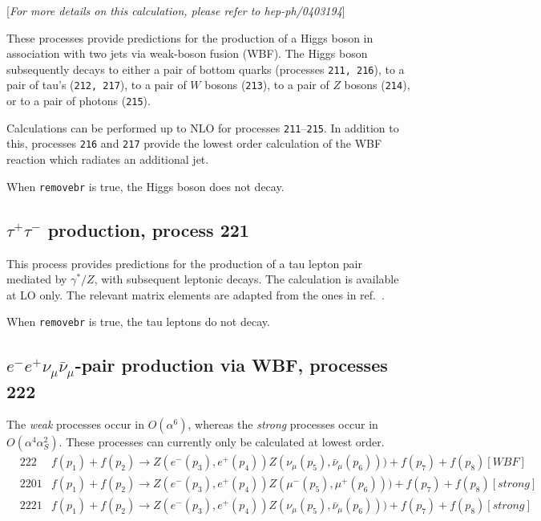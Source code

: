 \documentclass{article}
\begin{document}
{{{{{{\begin{center}
[{\it For more details on this calculation, please refer to hep-ph/0403194}]
\end{center}

These processes provide predictions for the production of a Higgs boson in
association with two jets via weak-boson fusion (WBF). The Higgs boson
subsequently decays to either a pair of bottom quarks
(processes {\tt 211, 216}), to a pair of tau's ({\tt 212, 217}), 
to a pair of $W$ bosons ({\tt 213}),
to a pair of $Z$ bosons ({\tt 214}),
or to a pair of photons ({\tt 215}).

Calculations can be performed up to NLO for processes {\tt 211}--{\tt 215}.
In addition to this, processes {\tt 216} and {\tt 217} provide the lowest
order calculation of the WBF reaction which radiates an additional jet. 

When {\tt removebr} is true, the Higgs boson does not decay.

\subsection{$\tau^+\tau^-$ production, process 221}
\label{subsec:tautau}

This process provides predictions for the production of a tau lepton
pair mediated by $\gamma^*/Z$, with subsequent leptonic decays. The calculation is available at LO
only. The relevant matrix elements are adapted from the ones in
ref.~\cite{Kleiss:1988xr}.

When {\tt removebr} is true, the tau leptons do not decay.


%
\subsection{$e^-e^+ \nu_{\mu} \bar\nu_{\mu} $-pair production via WBF, processes 222}
The {\it weak} processes occur in $O(\alpha^6)$, whereas the {\it strong} processes occur in $O(\alpha^4 \alpha_S^2)$.
These processes can currently only be calculated at lowest order.
\begin{eqnarray}
&222 &  f(p_1)+f(p_2) \to Z(e^-(p_3),e^+(p_4))Z(\nu_\mu(p_5),\bar{\nu}_\mu(p_6)))+f(p_7)+f(p_8) [WBF]  \nonumber \\
&2201 & f(p_1)+f(p_2) \to Z(e^-(p_3),e^+(p_4))Z(\mu^-(p_5),\mu^+(p_6)))+f(p_7)+f(p_8) [strong] \nonumber \\
&2221 & f(p_1)+f(p_2) \to Z(e^-(p_3),e^+(p_4))Z(\nu_\mu(p_5),\bar{\nu}_\mu(p_6)))+f(p_7)+f(p_8) [strong]  \nonumber
\end{eqnarray}
%
}}}}}}
\end{document}
